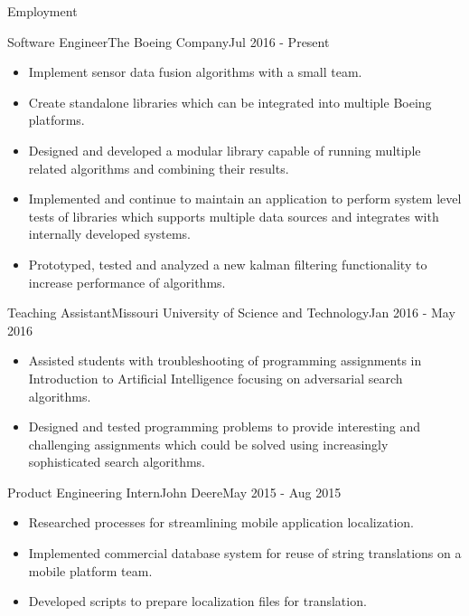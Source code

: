 \documentclass[]{mcdowellcv}
\begin{document}
\makeheader

\begin{cvsection}{Employment}

\begin{boeing}
    \begin{cvsubsection}{Software Engineer}{The Boeing Company}{Jul 2016 - Present}         
        \begin{itemize}
            \item Implement sensor data fusion algorithms with a small team. 
            \item Create standalone libraries which can be integrated into multiple Boeing platforms.
            \item Designed and developed a modular library capable of running multiple related algorithms and combining their results. 
            \item Implemented and continue to maintain an application to perform system level tests of libraries which supports multiple data sources and integrates with internally developed systems.  
            \item Prototyped, tested and analyzed a new kalman filtering functionality to increase performance of algorithms.
        \end{itemize}
    \end{cvsubsection}
\end{boeing}
    
\begin{aigrader}
    \begin{cvsubsection}[2]{Teaching Assistant}{Missouri University of Science and Technology}{Jan 2016 - May 2016}
        \begin{itemize}
            \item Assisted students with troubleshooting of programming assignments in Introduction to Artificial Intelligence focusing on adversarial search algorithms.
            \item Designed and tested programming problems to provide interesting and challenging assignments which could be solved using increasingly sophisticated search algorithms.
        \end{itemize}
    \end{cvsubsection}
\end{aigrader}

\begin{johndeere}
    \begin{cvsubsection}{Product Engineering Intern}{John Deere}{May 2015 - Aug 2015}
        \begin{itemize}
            \item Researched processes for streamlining mobile application localization.
            \item Implemented commercial database system for reuse of string translations on a mobile platform team.
            \item Developed scripts to prepare localization files for translation.
        \end{itemize}
    \end{cvsubsection}
\end{johndeere}
    

\end{cvsection}
\end{document}
